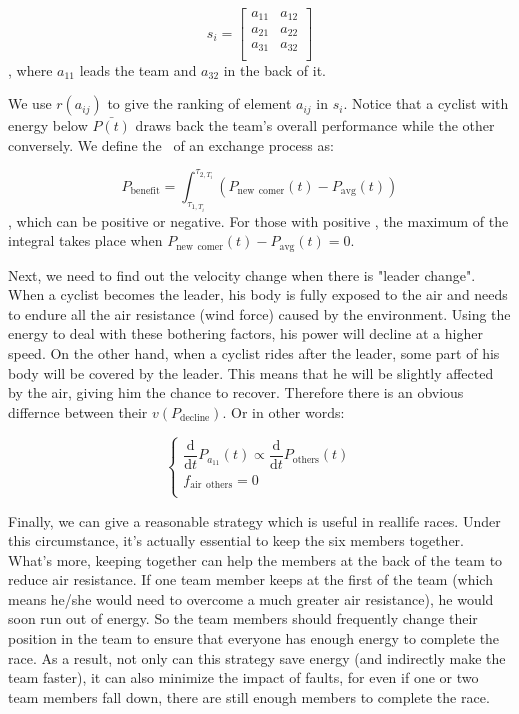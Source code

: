 \documentclass{article}
\begin{document}
				\[s_i=\left[ \begin{matrix}
					a_{11}&		a_{12}\\
					a_{21}&		a_{22}\\
					a_{31}&		a_{32}\\
				\end{matrix} \right] \]
				, where \(a_{11}\) leads the team and \(a_{32}\) in the back of it.

				We use \(r\left( a_{ij} \right) \) to give the ranking of element \(a_{ij}\) in \(s_i\). Notice that a cyclist with energy below \(\bar{P\left( t \right) }\) draws back the team's overall performance while the other conversely. We define the \ of an exchange process as:

				\[P_\mathrm{benefit} =\int_{\tau _{1,T_i}}^{\tau _{2,T_i}}{\left( P_{\mathrm{new}\:\:\mathrm{comer}}\left( t \right) -P_{\mathrm{avg}}\left( t \right) \right)}\], which can be positive or negative. For those with positive , the maximum of the integral takes place when \(P_{\mathrm{new}\:\:\mathrm{comer}}\left( t \right) -P_{\mathrm{avg}}\left( t \right) =0\).

				Next, we need to find out the velocity change when there is "leader change". When a cyclist becomes the leader, his body is fully exposed to the air and needs to endure all the air resistance (wind force) caused by the environment. Using the energy to deal with these bothering factors, his power will decline at a higher speed. On the other hand, when a cyclist rides after the leader, some part of his body will be covered by the leader. This means that he will be slightly affected by the air, giving him the chance to recover. Therefore there is an obvious differnce between their $v(P_\mathrm{decline})$. Or in other words:

				\[
					\begin{cases}
						\dfrac{\mathrm{d}}{\mathrm{d}t}P_{a_{11}}\left( t \right) \propto \dfrac{\mathrm{d}}{\mathrm{d}t}P_{\mathrm{others}}\left( t \right)\\
						f_{\mathrm{air}\:\:\mathrm{others}}=0\\
					\end{cases}
				\]

				Finally, we can give a reasonable strategy which is useful in reallife races. Under this circumstance, it's actually essential to keep the six members together. What's more, keeping together can help the members at the back of the team to reduce air resistance. If one team member keeps at the first of the team (which means he/she would need to overcome a much greater air resistance), he would soon run out of energy. So the team members should frequently change their position in the team to ensure that everyone has enough energy to complete the race. As a result, not only can this strategy save energy (and indirectly make the team faster), it can also minimize the impact of faults, for even if one or two team members fall down, there are still enough members to complete the race. 
\end{document}
